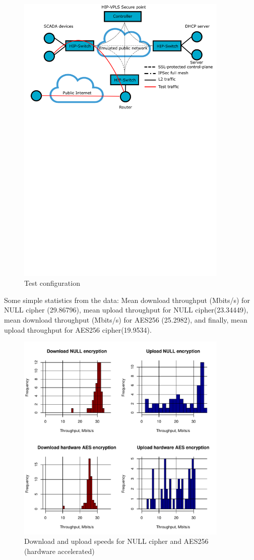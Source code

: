 \begin{figure}[h!]
\centering
\includegraphics[width=0.9\textwidth]{graphics/test.png}
\caption{Test configuration}
\label{fig:test}
\end{figure}

Some simple statistics from the data: Mean download throughput (Mbits/s) for NULL cipher (29.86796),
mean upload throughput for NULL cipher(23.34449), mean download throughput (Mbits/s) for AES256 (25.2982),
and finally, mean upload throughput for AES256 cipher(19.9534).

\begin{figure}[h!]
\centering
\includegraphics[width=0.9\textwidth]{graphics/final.pdf}
\caption{Download and upload speeds for NULL cipher and AES256 (hardware accelerated)}
\label{fig:results}
\end{figure}

